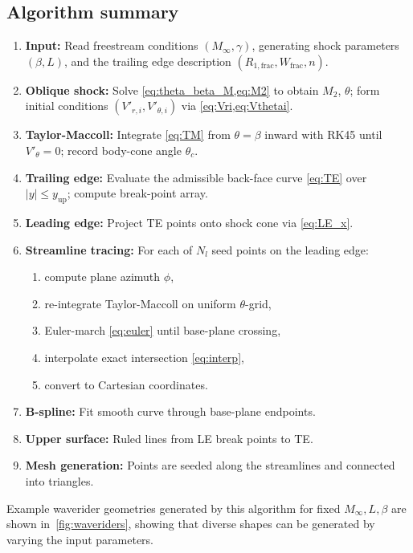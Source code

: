 \documentclass[10pt,a4paper]{article}
\begin{document}
\subsection{Algorithm summary}\label{sec:algorithm}
\begin{enumerate}[label=\textbf{Step \arabic*.}, leftmargin=*, itemsep=4pt]
    \item \textbf{Input:} Read freestream conditions $(M_\infty,\gamma)$, generating shock parameters $(\beta,L)$, and the trailing edge description $(R_{1,\mathrm{frac}}, W_{\mathrm{frac}}, n)$.
    \item \textbf{Oblique shock:} Solve \cref{eq:theta_beta_M,eq:M2} to obtain $M_2$, $\theta$; form initial conditions $(V'_{r,i}, V'_{\theta,i})$ via \cref{eq:Vri,eq:Vthetai}.
    \item \textbf{Taylor-Maccoll:} Integrate \cref{eq:TM} from $\theta = \beta$ inward with RK45 until $V'_\theta = 0$; record body-cone angle $\theta_c$.
    \item \textbf{Trailing edge:} Evaluate the admissible back-face curve \cref{eq:TE} over $|y| \le y_{\mathrm{up}}$; compute break-point array.
    \item \textbf{Leading edge:} Project TE points onto shock cone via \cref{eq:LE_x}.
    \item \textbf{Streamline tracing:} For each of $N_l$ seed points on the leading edge:
          \begin{enumerate}[label=\alph*.]
              \item compute plane azimuth $\phi$,
              \item re-integrate Taylor-Maccoll on uniform $\theta$-grid,
              \item Euler-march \cref{eq:euler} until base-plane crossing,
              \item interpolate exact intersection \cref{eq:interp},
              \item convert to Cartesian coordinates.
          \end{enumerate}
    \item \textbf{B-spline:} Fit smooth curve through base-plane endpoints.
    \item \textbf{Upper surface:} Ruled lines from LE break points to TE.
    \item \textbf{Mesh generation:} Points are seeded along the streamlines and connected into triangles.\@
\end{enumerate}

Example waverider geometries generated by this algorithm for fixed $M_\infty,L,\beta$ are shown in~\cref{fig:waveriders}, showing that diverse shapes can be generated by varying the input parameters.
\end{document}

